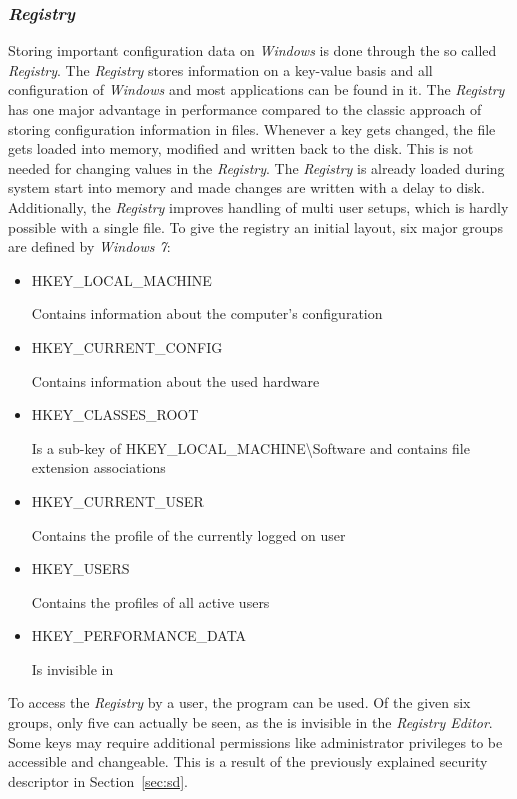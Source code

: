\subsubsection{\emph{Registry}}
Storing important configuration data on \emph{Windows} is done through the so called \emph{Registry}. The \emph{Registry} stores information on a key-value basis and all configuration of \emph{Windows} and most applications can be found in it. The \emph{Registry} has one major advantage in performance compared to the classic approach of storing configuration information in  files. Whenever a key gets changed, the  file gets loaded into memory, modified and written back to the disk. This is not needed for changing values in the \emph{Registry}. The \emph{Registry} is already loaded during system start into memory and made changes are written with a delay to disk. Additionally, the \emph{Registry} improves handling of multi user setups, which is hardly possible with a single  file. To give the registry an initial layout, six major groups are defined by \emph{Windows 7}:
\begin{itemize}
\label{sec:registrykeys}
\item HKEY\_LOCAL\_MACHINE

Contains information about the computer's configuration
\item HKEY\_CURRENT\_CONFIG

Contains information about the used hardware
\item HKEY\_CLASSES\_ROOT

Is a sub-key of HKEY\_LOCAL\_MACHINE\textbackslash Software and contains file extension associations
\item HKEY\_CURRENT\_USER 

Contains the profile of the currently logged on user
\item HKEY\_USERS

Contains the profiles of all active users
\item HKEY\_PERFORMANCE\_DATA

Is invisible in 
\end{itemize}
To access the \emph{Registry} by a user, the  \cite{msdn_regedit} program can be used. Of the given six groups, only five can actually be seen, as the  is invisible in the \emph{Registry Editor}. Some keys may require additional permissions like administrator privileges to be accessible and changeable. This is a result of the previously explained security descriptor in Section~\ref{sec:sd}.